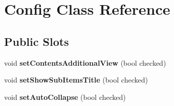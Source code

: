 \hypertarget{classConfig}{
\section{Config Class Reference}
\label{classConfig}
}
\subsection*{Public Slots}
\begin{DoxyCompactItemize}
\item 
\hypertarget{classConfig_a1756a954a692bd53c314ec51c983f167}{
void {\bfseries setContentsAdditionalView} (bool checked)}
\label{classConfig_a1756a954a692bd53c314ec51c983f167}

\item 
\hypertarget{classConfig_a26d246caff51b482a49c6fc14caed0da}{
void {\bfseries setShowSubItemsTitle} (bool checked)}
\label{classConfig_a26d246caff51b482a49c6fc14caed0da}

\item 
\hypertarget{classConfig_a2cb33678342e5aec9d64ba1c8439264d}{
void {\bfseries setAutoCollapse} (bool checked)}
\label{classConfig_a2cb33678342e5aec9d64ba1c8439264d}

\end{DoxyCompactItemize}
